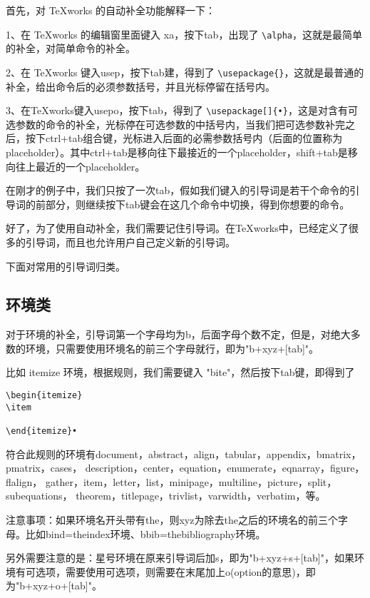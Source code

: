 首先，对 TeXworks 的自动补全功能解释一下：

1、在 TeXworks 的编辑窗里面键入 xa，按下tab，出现了 \verb|\alpha|，这就是最简单的补全，对简单命令的补全。

2、在 TeXworks 键入usep，按下tab建，得到了 \verb|\usepackage{}|，这就是最普通的补全，给出命令后的必须参数括号，并且光标停留在括号内。

3、在TeXworks键入usepo，按下tab，得到了 \verb|\usepackage[]{•}|，这是对含有可选参数的命令的补全，光标停在可选参数的中括号内，当我们把可选参数补完之后，按下ctrl+tab组合键，光标进入后面的必需参数括号内（后面的位置称为placeholder）。其中ctrl+tab是移向往下最接近的一个placeholder，shift+tab是移向往上最近的一个placeholder。
 
在刚才的例子中，我们只按了一次tab，假如我们键入的引导词是若干个命令的引导词的前部分，则继续按下tab键会在这几个命令中切换，得到你想要的命令。
 
好了，为了使用自动补全，我们需要记住引导词。在TeXworks中，已经定义了很多的引导词，而且也允许用户自己定义新的引导词。
 
下面对常用的引导词归类。
 
\subsection{环境类}
对于环境的补全，引导词第一个字母均为b，后面字母个数不定，但是，对绝大多数的环境，只需要使用环境名的前三个字母就行，即为"b+xyz+[tab]"。
 
比如 itemize 环境，根据规则，我们需要键入 "bite"，然后按下tab键，即得到了
\begin{verbatim}
\begin{itemize}
\item
 
\end{itemize}•	
\end{verbatim}

符合此规则的环境有document，abstract，align，tabular，appendix，bmatrix，pmatrix，cases，
description，center，equation，enumerate，eqnarray，figure，flalign，
gather，item，letter，list，minipage，multiline，picture，split，subequations，
theorem，titlepage，trivlist，varwidth，verbatim，等。
 
注意事项：如果环境名开头带有the，则xyz为除去the之后的环境名的前三个字母。比如bind=theindex环境、bbib=thebibliography环境。
 
另外需要注意的是：星号环境在原来引导词后加s，即为"b+xyz+s+[tab]"，如果环境有可选项，需要使用可选项，则需要在末尾加上o(option的意思)，即为"b+xyz+o+[tab]"。
 
